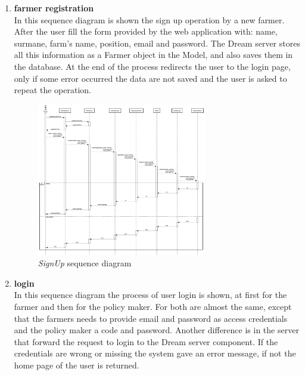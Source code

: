 \begin{enumerate}
    \item \textbf{farmer registration}\\
    In this sequence diagram is shown the sign up operation by a new farmer. After the user fill the form provided by the web application with: name, surmane, farm's name, position, email and password. The Dream server stores all this information as a Farmer object in the Model, and also saves them in the database. At the end of the process redirects the user to the login page, only if some error occurred the data are not saved and the user is asked to repeat the operation.
    \begin{figure}[H]
        \begin{center}
        \includegraphics[width=0.7\textwidth]{sequence/signup.png}
        \caption{\emph{SignUp} sequence diagram}
        \label{fig:sequence1}
        \end{center}
    \end{figure}
    \item \textbf{login}\\
    In this sequence diagram the process of user login is shown, at first for the farmer and then for the policy maker. For both are almost the same, except that the farmers needs to provide email and password as access credentials and the policy maker a code and password. Another difference is in the server that forward the request to login to the Dream server component. If the credentials are wrong or missing the system gave an error message, if not the home page of the user is returned.
    \begin{figure}[H]
        \begin{center}

\end{center}
\end{figure}
\end{enumerate}
